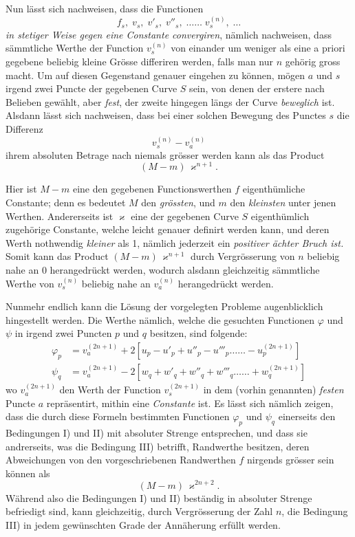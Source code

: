 \documentclass{article}
\begin{document}
Nun lässt sich nachweisen, dass die Functionen
\[
f_{s},\; v_{s},\; v'_{s},\; v''_{s},\; \ldots\ldots\; v_{s}^{(n)},\; \ldots
\]
\emph{in stetiger Weise gegen eine Constante convergiren}, nämlich nachweisen, dass sämmtliche Werthe der Function $v_{s}^{(n)}$ von einander um weniger als eine a priori gegebene beliebig kleine Grösse differiren werden, falls man nur $n$ gehörig gross macht. Um auf diesen Gegenstand genauer eingehen zu können, mögen $a$ und $s$ irgend zwei Puncte der gegebenen Curve $S$ sein, von denen der erstere nach Belieben gewählt, aber \emph{fest}, der zweite hingegen längs der Curve \emph{beweglich} ist. Alsdann lässt sich nachweisen, dass bei einer solchen Bewegung des Punctes $s$ die Differenz
\[
v_{s}^{(n)}-v_{a}^{(n)}
\]
ihrem absoluten Betrage nach niemals grösser werden kann als das Product
\[
(M-m)\,\varkappa^{n+1}.
\]

Hier ist $M-m$ eine den gegebenen Functionswerthen $f$ eigenthümliche Constante; denn es bedeutet $M$ den \emph{grössten}, und $m$ den \emph{kleinsten} unter jenen Werthen. Andererseits ist $\varkappa$ eine der gegebenen Curve $S$ eigenthümlich zugehörige Constante, welche leicht genauer definirt werden kann, und deren Werth nothwendig \emph{kleiner} als 1, nämlich jederzeit ein \emph{positiver ächter Bruch ist.} Somit kann das Product $(M-m)\,\varkappa^{n+1}$ durch Vergrösserung von $n$ beliebig nahe an 0 herangedrückt werden, wodurch alsdann gleichzeitig sämmtliche Werthe von $v_{s}^{(n)}$ beliebig nahe an $v_{a}^{(n)}$ herangedrückt werden.

Nunmehr endlich kann die Lösung der vorgelegten Probleme augenblicklich hingestellt werden. Die Werthe nämlich, welche die gesuchten Functionen $\varphi$ und $\psi$ in irgend zwei Puncten $p$ und $q$ besitzen, sind folgende:
\[
\begin{aligned}
\varphi_{p} &= v_{a}^{(2n+1)}+2\left[u_{p}-u'_{p}+u''_{p}-u'''_{p}\ldots\ldots-u_{p}^{(2n+1)}\right]\\
\psi_{q} &= v_{a}^{(2n+1)}-2\left[w_{q}+w'_{q}+w''_{q}+w'''_{q}\ldots\ldots+w_{q}^{(2n+1)}\right]
\end{aligned}
\]
wo $v_{a}^{(2n+1)}$ den Werth der Function $v_{s}^{(2n+1)}$ in dem (vorhin genannten) \emph{festen} Puncte $a$ repräsentirt, mithin eine \emph{Constante} ist. Es lässt sich nämlich zeigen, dass die durch diese Formeln bestimmten Functionen $\varphi_{p}$ und $\psi_{q}$ einerseits den Bedingungen I) und II) mit absoluter Strenge entsprechen, und dass sie andrerseits, was die Bedingung III) betrifft, Randwerthe besitzen, deren Abweichungen von den vorgeschriebenen Randwerthen $f$ nirgends grösser sein können als
\[
(M-m)\,\varkappa^{2n+2}.
\]
Während also die Bedingungen I) und II) beständig in absoluter Strenge befriedigt sind, kann gleichzeitig, durch Vergrösserung der Zahl $n$, die Bedingung III) in jedem gewünschten Grade der Annäherung erfüllt werden.
\end{document}
